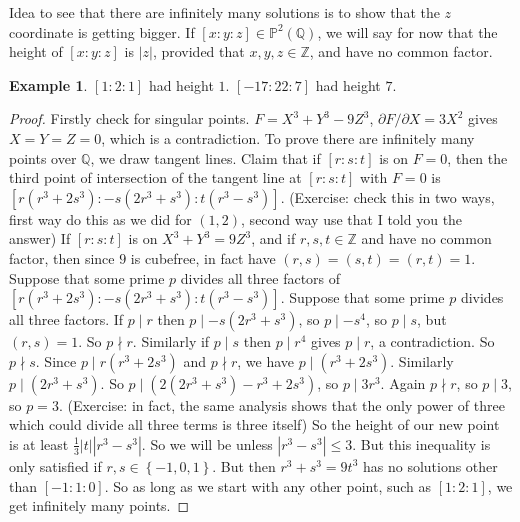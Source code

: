 \documentclass{article}
\newcommand{\Z}{\mathbb{Z}}
\newcommand{\Q}{\mathbb{Q}}
\renewcommand{\P}{\mathbb{P}}
\newcommand{\rb}[1]{\left( #1 \right)}
\renewcommand{\sb}[1]{\left[ #1 \right]}
\newcommand{\cb}[1]{\left\{ #1 \right\}}
\newcommand{\abs}[1]{\left\lvert #1 \right\rvert}
\theoremstyle{definition}\newtheorem{definition}{Definition}[section]
\theoremstyle{definition}\newtheorem{remark}[definition]{Remark}
\theoremstyle{definition}\newtheorem*{example}{Example}
\theoremstyle{definition}\newtheorem*{note}{Note}
\begin{document}
Idea to see that there are infinitely many solutions is to show that the $ z $ coordinate is getting bigger. If $ \sb{x : y : z} \in \P^2\rb{\Q} $, we will say for now that the height of $ \sb{x : y : z} $ is $ \abs{z} $, provided that $ x, y, z \in \Z $, and have no common factor.

\begin{example}
$ \sb{1 : 2 : 1} $ had height $ 1 $. $ \sb{-17 : 22 : 7} $ had height $ 7 $.
\end{example}

\begin{proof}
Firstly check for singular points. $ F = X^3 + Y^3 - 9Z^3 $, $ \partial F / \partial X = 3X^2 $ gives $ X = Y = Z = 0 $, which is a contradiction. To prove there are infinitely many points over $ \Q $, we draw tangent lines. Claim that if $ \sb{r : s : t} $ is on $ F = 0 $, then the third point of intersection of the tangent line at $ \sb{r : s : t} $ with $ F = 0 $ is $ \sb{r\rb{r^3 + 2s^3} : -s\rb{2r^3 + s^3} : t\rb{r^3 - s^3}} $. (Exercise: check this in two ways, first way do this as we did for $ \rb{1, 2} $, second way use that I told you the answer) If $ \sb{r : s : t} $ is on $ X^3 + Y^3 = 9Z^3 $, and if $ r, s, t \in \Z $ and have no common factor, then since $ 9 $ is cubefree, in fact have $ \rb{r, s} = \rb{s, t} = \rb{r, t} = 1 $. Suppose that some prime $ p $ divides all three factors of $ \sb{r\rb{r^3 + 2s^3} : -s\rb{2r^3 + s^3} : t\rb{r^3 - s^3}} $. Suppose that some prime $ p $ divides all three factors. If $ p \mid r $ then $ p \mid -s\rb{2r^3 + s^3} $, so $ p \mid -s^4 $, so $ p \mid s $, but $ \rb{r, s} = 1 $. So $ p \nmid r $. Similarly if $ p \mid s $ then $ p \mid r^4 $ gives $ p \mid r $, a contradiction. So $ p \nmid s $. Since $ p \mid r\rb{r^3 + 2s^3} $ and $ p \nmid r $, we have $ p \mid \rb{r^3 + 2s^3} $. Similarly $ p \mid \rb{2r^3 + s^3} $. So $ p \mid \rb{2\rb{2r^3 + s^3} - r^3 + 2s^3} $, so $ p \mid 3r^3 $. Again $ p \nmid r $, so $ p \mid 3 $, so $ p = 3 $. (Exercise: in fact, the same analysis shows that the only power of three which could divide all three terms is three itself) So the height of our new point is at least $ \tfrac{1}{3}\abs{t}\abs{r^3 - s^3} $. So we will be unless $ \abs{r^3 - s^3} \le 3 $. But this inequality is only satisfied if $ r, s \in \cb{-1, 0, 1} $. But then $ r^3 + s^3 = 9t^3 $ has no solutions other than $ \sb{-1 : 1 : 0} $. So as long as we start with any other point, such as $ \sb{1 : 2 : 1} $, we get infinitely many points.
\end{proof}
\end{document}
